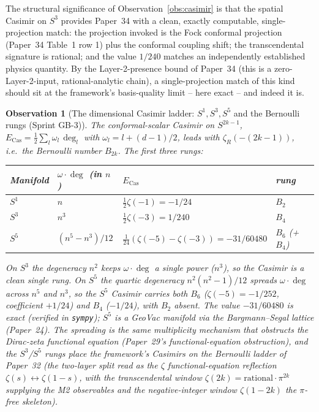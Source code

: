 \documentclass[11pt]{article}
\newtheorem{observation}{Observation}
\begin{document}
The structural significance of Observation~\ref{obs:casimir} is that the
spatial Casimir on $S^3$ provides Paper~34 with a clean, exactly
computable, single-projection match: the projection invoked is the Fock
conformal projection (Paper~34 Table~1 row 1) plus the conformal
coupling shift; the transcendental signature is rational; and the value
$1/240$ matches an independently established physics quantity.  By the
Layer-2-presence bound of Paper~34 (this is a zero-Layer-2-input,
rational-analytic chain), a single-projection match of this kind
should sit at the framework's basis-quality limit -- here exact -- and
indeed it is.

\begin{observation}[The dimensional Casimir ladder: $S^1, S^3, S^5$ and
the Bernoulli rungs (Sprint GB-3)]
\label{obs:casimir_ladder}
The conformal-scalar Casimir on $S^{2k-1}$,
$E_\text{Cas} = \tfrac{1}{2}\sum_l \omega_l\,\deg_l$ with $\omega_l =
l + (d{-}1)/2$, leads with $\zeta_R(-(2k{-}1))$, i.e.\ the Bernoulli
number $B_{2k}$. The first three rungs:
\begin{center}
\small
\begin{tabular}{p{1.4cm} p{3.2cm} p{2.0cm} p{2.2cm}}
\toprule
Manifold & $\omega\cdot\deg$ (in $n$) & $E_\text{Cas}$ & rung \\
\midrule
$S^1$ & $n$ & $\tfrac{1}{2}\zeta(-1) = -1/24$ & $B_2$ \\
$S^3$ & $n^3$ & $\tfrac{1}{2}\zeta(-3) = 1/240$ & $B_4$ \\
$S^5$ & $(n^5 - n^3)/12$ & $\tfrac{1}{24}(\zeta(-5){-}\zeta(-3)) = -31/60480$ & $B_6$ (+ $B_4$) \\
\bottomrule
\end{tabular}
\end{center}
On $S^3$ the degeneracy $n^2$ keeps $\omega\cdot\deg$ a single power
($n^3$), so the Casimir is a clean single rung. On $S^5$ the quartic
degeneracy $n^2(n^2{-}1)/12$ spreads $\omega\cdot\deg$ across $n^5$ and
$n^3$, so the $S^5$ Casimir carries \emph{both} $B_6$ ($\zeta(-5) =
-1/252$, coefficient $+1/24$) and $B_4$ ($-1/24$), with $B_2$
\emph{absent}. The value $-31/60480$ is exact (verified in
\texttt{sympy}); $S^5$ is a GeoVac
manifold via the Bargmann--Segal lattice (Paper~24). The spreading is
the same multiplicity mechanism that obstructs the Dirac-zeta
functional equation (Paper~29's functional-equation obstruction), and the
$S^3$/$S^5$ rungs place the framework's Casimirs on the Bernoulli
ladder of Paper~32 (the two-layer split read as the $\zeta$
functional-equation reflection $\zeta(s)\leftrightarrow\zeta(1{-}s)$,
with the transcendental window $\zeta(2k) = \text{rational}\cdot
\pi^{2k}$ supplying the M2 observables and the negative-integer window
$\zeta(1{-}2k)$ the $\pi$-free skeleton).
\end{observation}
\end{document}
